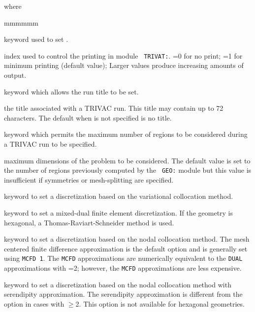 \noindent where
\begin{ListeDeDescription}{mmmmmm}

\item[\moc{EDIT}] keyword used to set .

\item[\dusa{iprint}] index used to control the printing  in module {\tt
TRIVAT:}. =0 for no print; =1 for minimum printing (default value); Larger
values produce increasing amounts of output.

\item[\moc{TITL}] keyword which allows the run title to be set.

\item[\dusa{TITLE}] the title associated with a TRIVAC run. This
title may contain up to 72 characters. The default when  is not specified is no title.

\item[\moc{MAXR}] keyword which permits the maximum number of regions to be considered during a TRIVAC run to be specified.

\item[\dusa{maxpts}] maximum dimensions of the problem to be considered.  The
default value is set to the number of regions previously computed by the {\tt
GEO:} module but this value is insufficient if symmetries or mesh-splitting
are specified.

\item[\moc{PRIM}] keyword to set a discretization based on the variational collocation method.

\item[\moc{DUAL}] keyword to set a mixed-dual finite element discretization. If the
geometry is hexagonal, a Thomas-Raviart-Schneider method is used.\cite{rts}

\item[\moc{MCFD}] keyword to set a discretization based  on the nodal
collocation method. The mesh centered finite difference approximation is the
default option and is generally set using {\tt MCFD~1}. The {\tt MCFD}
approximations are numerically equivalent to the {\tt DUAL} approximations
with =2; however, the {\tt MCFD} approximations are less
expensive. 

\item[\moc{LUMP}] keyword to set a discretization  based on the nodal
collocation method with serendipity approximation. The serendipity
approximation is different from the  option in cases with $\ge$2. This option is not available for hexagonal geometries.


\end{ListeDeDescription}

